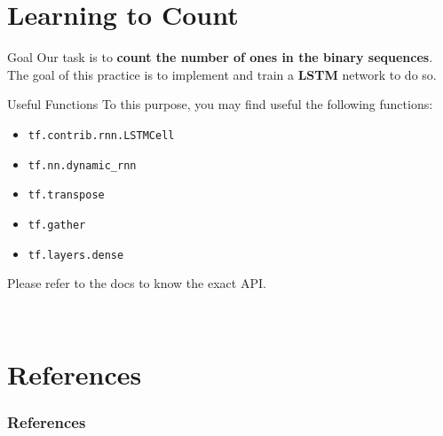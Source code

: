 \documentclass[aspectratio=169]{beamer}
\begin{document}
\section{Learning to Count}

\begin{frame}[fragile]{Goal}
Our task is to \textbf{count the number of ones in the binary sequences}.\\
\vspace{0.5cm}
The goal of this practice is to implement and train a \textbf{LSTM} \cite{hochreiter1997long} network to do so.
\end{frame}


\begin{frame}{Useful Functions}
To this purpose, you may find useful the following functions:
\begin{itemize}
\item \texttt{tf.contrib.rnn.LSTMCell}
\item \texttt{tf.nn.dynamic\_rnn}
\item \texttt{tf.transpose}
\item \texttt{tf.gather}
\item \texttt{tf.layers.dense}
\end{itemize}
Please refer to the docs to know the exact API.
\end{frame}


\begin{frame}{\ }
\end{frame}


\section{References}

\begin{frame}[t, allowframebreaks]
\frametitle{References}


\end{frame}
\end{document}
